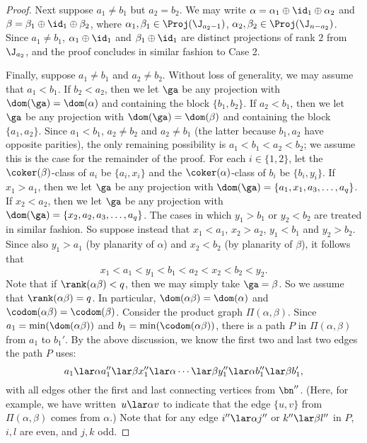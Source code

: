\begin{proof}
\bigskip{} Next suppose $a_1\not=b_1$ but $a_2=b_2$.  We may write $\alpha=\alpha_1\oplus\id_1\oplus\alpha_2$ and $\beta=\beta_1\oplus\id_1\oplus\beta_2$, where $\alpha_1,\beta_1\in\Proj(\J_{a_2-1})$, $\alpha_2,\beta_2\in\Proj(\J_{n-a_2})$.  Since $a_1\not=b_1$, $\alpha_1\oplus\id_1$ and $\beta_1\oplus\id_1$ are distinct projections of rank $2$ from $\J_{a_2}$, and the proof concludes in similar fashion to Case 2.





\bigskip{}  Finally, suppose $a_1\not=b_1$ and $a_2\not=b_2$.  Without loss of generality, we may assume that $a_1<b_1$.
%
If $b_2<a_2$, then we let $\ga$ be any projection with $\dom(\ga)=\dom(\alpha)$ and containing the block $\{b_1,b_2\}$.
%
If $a_2<b_1$, then we let $\ga$ be any projection with $\dom(\ga)=\dom(\beta)$ and containing the block $\{a_1,a_2\}$.
%
Since $a_1<b_1$, $a_2\not=b_2$ and $a_2\not=b_1$ (the latter because $b_1,a_2$ have opposite parities), the only remaining possibility is $a_1<b_1<a_2<b_2$; we assume this is the case for the remainder of the proof.
%
For each $i\in\{1,2\}$, let the $\coker(\beta)$-class of $a_i$ be $\{a_i,x_i\}$ and the $\coker(\alpha)$-class of $b_i$ be $\{b_i,y_i\}$.  If $x_1>a_1$, then we let $\ga$ be any projection with $\dom(\ga)=\{a_1,x_1,a_3,\ldots,a_q\}$.  If $x_2<a_2$, then we let $\ga$ be any projection with $\dom(\ga)=\{x_2,a_2,a_3,\ldots,a_q\}$.  The cases in which $y_1>b_1$ or $y_2<b_2$ are treated in similar fashion.  So suppose instead that $x_1<a_1$, $x_2>a_2$,  $y_1<b_1$ and $y_2>b_2$.  Since also $y_1>a_1$ (by planarity of $\alpha$) and $x_2<b_2$ (by planarity of $\beta$), it follows that
\[
x_1<a_1<y_1<b_1<a_2<x_2<b_2<y_2.
\]
Note that if $\rank(\alpha\beta)<q$, then we may simply take $\ga=\beta$.  So we assume that $\rank(\alpha\beta)=q$.  In particular, $\dom(\alpha\beta)=\dom(\alpha)$ and $\codom(\alpha\beta)=\codom(\beta)$.  Consider the product graph $\Pi(\alpha,\beta)$.  Since $a_1=\min(\dom(\alpha\beta))$ and $b_1=\min(\codom(\alpha\beta))$, there is a path $P$ in $\Pi(\alpha,\beta)$ from $a_1$ to $b_1'$.  By the above discussion, we know the first two and last two edges the path $P$ uses:
\[
a_1 \lar\alpha a_1'' \lar\beta x_1'' \lar\alpha \cdots \lar\beta y_1'' \lar\alpha b_1'' \lar\beta b_1',
\]
with all edges other the first and last connecting vertices from $\bn''$.  (Here, for example, we have written~${u\lar\alpha v}$ to indicate that the edge $\{u,v\}$ from $\Pi(\alpha,\beta)$ comes from $\alpha$.)  Note that for any edge $i''\lar\alpha j''$ or $k''\lar\beta l''$ in $P$, $i,l$ are even, and $j,k$ odd.

\end{proof}
